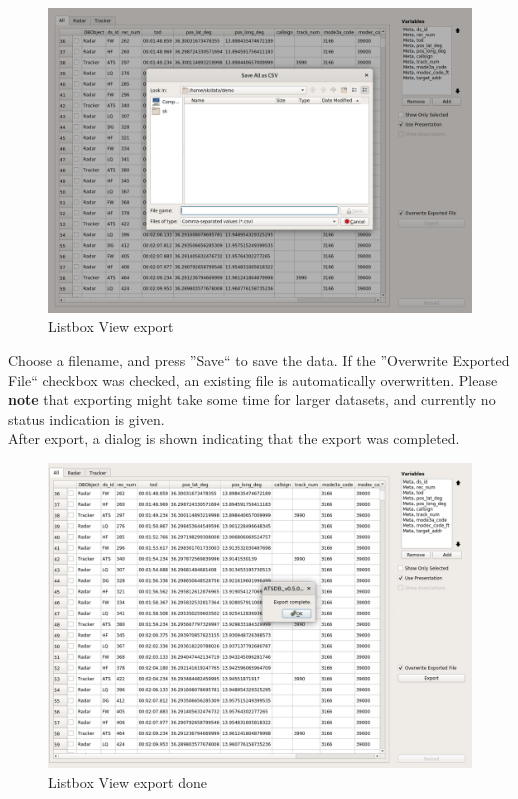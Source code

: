 \begin{figure}[H]
    \hspace*{-2cm}
    \includegraphics[width=18cm,frame]{../screenshots/listbox_export.png}
  \caption{Listbox View export}
  \label{fig:listbox_export}
\end{figure}

Choose a filename, and press ''Save`` to save the data. If the ''Overwrite Exported File`` checkbox was checked, an existing file is automatically overwritten. Please \textbf{note} that exporting might take some time for larger datasets, and currently no status indication is given.\\

After export, a dialog is shown indicating that the export was completed.

\begin{figure}[H]
    \hspace*{-2cm}
    \includegraphics[width=18cm,frame]{../screenshots/listbox_exported.png}
  \caption{Listbox View export done}
  \label{fig:listbox_exported}
\end{figure}


